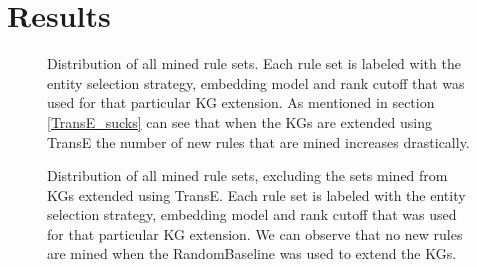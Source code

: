 \chapter{Results}
\begin{figure}[htbp]
\centering
    \centering
    
    \caption{Distribution of all mined rule sets. Each rule set is labeled with the entity selection strategy, embedding model and rank cutoff that was used for that particular KG extension. As mentioned in section \ref{TransE_sucks} can see that when the KGs are extended using TransE the number of new rules that are mined increases drastically.}
    \label{all_sets}
\end{figure}


\begin{figure}[htbp]
\centering
    \centering
    
    \caption{Distribution of all mined rule sets, excluding the sets mined from KGs extended using TransE. Each rule set is labeled with the entity selection strategy, embedding model and rank cutoff that was used for that particular KG extension. We can observe that no new rules are mined when the RandomBaseline was used to extend the KGs.}
    \label{all_sets_w_out_TransE}
\end{figure}
\iffalse
